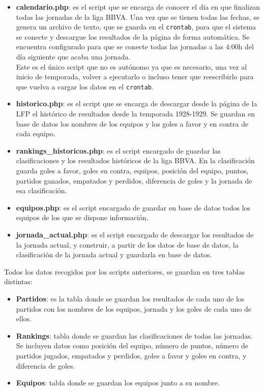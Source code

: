 \begin{itemize}
\item \textbf{calendario.php}: es el script que se encarga de conocer el día en que finalizan todas las jornadas de la liga BBVA. Una vez que se tienen todas las fechas, se genera un archivo de texto, que se guarda en el \texttt{crontab}, para que el sistema se conecte y descargue los resultados de la página de forma automática. Se encuentra configurado para que se conecte todas las jornadas a las 4:00h del día siguiente que acaba una jornada.\\
Este es el único script que no es autónomo ya que es necesario, una vez al inicio de temporada, volver a ejecutarlo o incluso tener que reescribirlo para que vuelva a cargar los datos en el \texttt{crontab}.

\item \textbf{historico.php}: es el script que se encarga de descargar desde la página de la LFP el histórico de resultados desde la temporada 1928-1929. Se guardan en base de datos los nombres de los equipos y los goles a favor y en contra de cada equipo.

\item \textbf{rankings\_historicos.php}: es el script encargado de guardar las clasificaciones y los resultados históricos de la liga BBVA. En la clasificación guarda goles a favor, goles en contra, equipos, posición del equipo, puntos, partidos ganados, empatados y perdidos, diferencia de goles y la jornada de esa clasificación.

\item \textbf{equipos.php}: es el script encargado de guardar en base de datos todos los equipos de los que se dispone información.

\item \textbf{jornada\_actual.php}: es el script encargado de descargar los resultados de la jornada actual, y construir, a partir de los datos de base de datos, la clasificación de la jornada actual y guardarla en base de datos.

\end{itemize}

Todos los datos recogidos por los scripts anteriores, se guardan en tres tablas distintas:

\begin{itemize}
\item \textbf{Partidos}: es la tabla donde se guardan los resultados de cada uno de los partidos con los nombres de los equipos, jornada y los goles de cada uno de ellos.

\item \textbf{Rankings}: tabla donde se guardan las clasificaciones de todas las jornadas. Se incluyen datos como posición del equipo, número de puntos, número de partidos jugados, empatados y perdidos, goles a favor y goles en contra, y diferencia de goles.

\item \textbf{Equipos}: tabla donde se guardan los equipos junto a su nombre.
\end{itemize}

